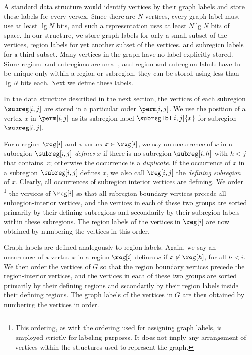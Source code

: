 {A standard data structure would identify vertices by their graph labels and
store these labels for every vertex.
Since there are $N$ vertices, every graph label must use at least
$\lg N$ bits, and such a representation uses at least $N \lg N$ bits of space.
In our structure, we store graph labels for only a small subset of the vertices, 
region labels for yet another subset of the vertices, and subregion labels for 
a third subset. 
Many vertices in the graph have no label explicitly stored.
Since regions and subregions are small, and region and subregion labels have to
be unique only within a region or subregion, they can be stored using
less than $\lg N$ bits each.
Next we define these labels.

In the data structure described in the next section, the vertices of
each subregion $\subreg[i,j]$ are stored in a particular order $\perm[i,j]$.
We use the position of a vertex $x$ in $\perm[i,j]$ as its
subregion label $\subreglbl[i,j]{x}$ for subregion~$\subreg[i,j]$.

For a region $\reg[i]$ and a vertex $x \in \reg[i]$, we say an occurrence of
$x$ in a subregion $\subreg[i,j]$ \emph{defines} $x$ if there is no
subregion $\subreg[i,h]$ with $h < j$ that contains~$x$; otherwise the
occurrence is a \emph{duplicate}.
If the occurrence of $x$ in a subregion $\subreg[i,j]$ defines $x$, we also call
$\reg[i,j]$ the \emph{defining subregion} of $x$.
Clearly, all occurrences of subregion interior vertices are
defining.
We order \footnote{This ordering, as with the ordering used for assigning 
graph labels, is employed strictly for labeling purposes. It does not imply
any arrangement of vertices within the structures used to represent the graph.}
the vertices of $\reg[i]$ so that all subregion boundary vertices
precede all subregion-interior vertices, and the vertices in each of these two
groups are sorted primarily by their defining subregions and secondarily by
their subregion labels within these subregions.
The region labels of the vertices in $\reg[i]$ are now obtained by numbering the
vertices in this order.


Graph labels are defined analogously to region labels.
Again, we say an occurrence of a vertex $x$ in a region $\reg[i]$ defines
$x$ if $x \not\in \reg[h]$, for all $h < i$.
We then order the vertices of $G$ so that the region boundary vertices precede
the region-interior vertices, and the vertices in each of these two groups are
sorted primarily by their defining regions and secondarily by their region
labels inside their defining regions.
The graph labels of the vertices in $G$ are
then obtained by numbering the vertices in order.

}
